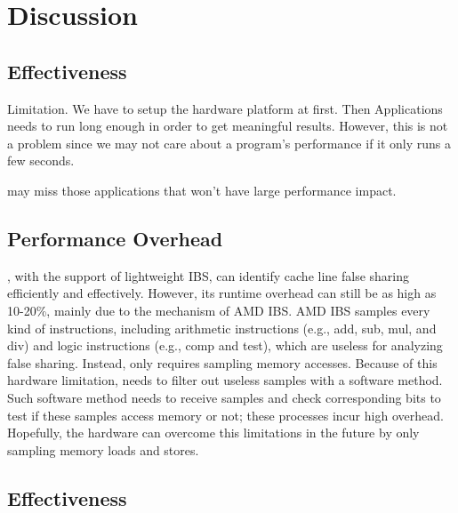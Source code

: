 \section{Discussion}

\label{sec:discuss}
\subsection{Effectiveness}

Limitation. 
We have to setup the hardware platform at first. 
Then Applications needs to run long enough in order to get meaningful results. 
However, this is not a problem since we may not care about a program's performance if it only runs a few seconds. 

\Cheetah{} may miss those applications that won't have large performance impact. 

\subsection{Performance Overhead}

\Cheetah{}, with the support of lightweight IBS, can identify cache line false sharing efficiently and effectively. However, its runtime overhead can still be as high as 10-20\%, mainly due to the mechanism of AMD IBS. AMD IBS samples every kind of instructions, including arithmetic instructions (e.g., add, sub, mul, and div) and logic instructions (e.g., comp and test), which are useless for analyzing false sharing. Instead, \cheetah{} only requires sampling memory accesses. Because of this hardware limitation, \cheetah{} needs to filter out useless samples with a software method. Such software method needs \cheetah{} to receive samples and check corresponding bits to test if these samples access memory or not; these processes incur high overhead. Hopefully, the hardware can overcome this limitations in the future by only sampling memory loads and stores.

\subsection{Effectiveness}
